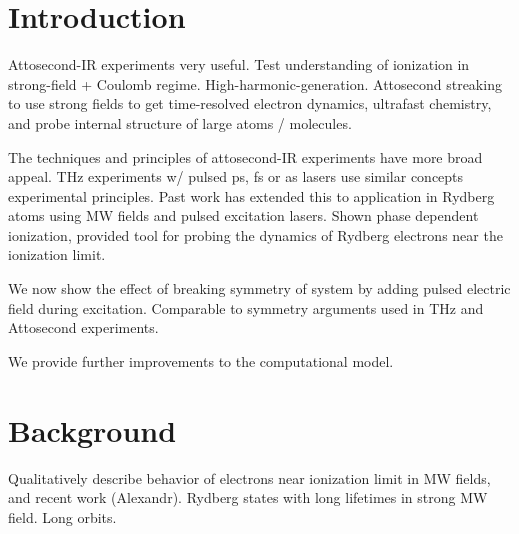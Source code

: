 \documentclass[aps,pra,preprint,groupedaddress]{revtex4-1}
\begin{document}

\section{\label{sec:intro}Introduction}

Attosecond-IR experiments very useful. Test understanding of ionization in strong-field + Coulomb regime. High-harmonic-generation. Attosecond streaking to use strong fields to get time-resolved electron dynamics, ultrafast chemistry, and probe internal structure of large atoms / molecules.

The techniques and principles of attosecond-IR experiments have more broad appeal. THz experiments w/ pulsed ps, fs or as lasers use similar concepts experimental principles. Past work has extended this to application in Rydberg atoms using MW fields and pulsed excitation lasers. Shown phase dependent ionization, provided tool for probing the dynamics of Rydberg electrons near the ionization limit.

We now show the effect of breaking symmetry of system by adding pulsed electric field during excitation. Comparable to symmetry arguments used in THz and Attosecond experiments.

We provide further improvements to the computational model.


\section{\label{sec:back} Background}

Qualitatively describe behavior of electrons near ionization limit in MW fields, and recent work (Alexandr). Rydberg states with long lifetimes in strong MW field. Long orbits.
\end{document}
